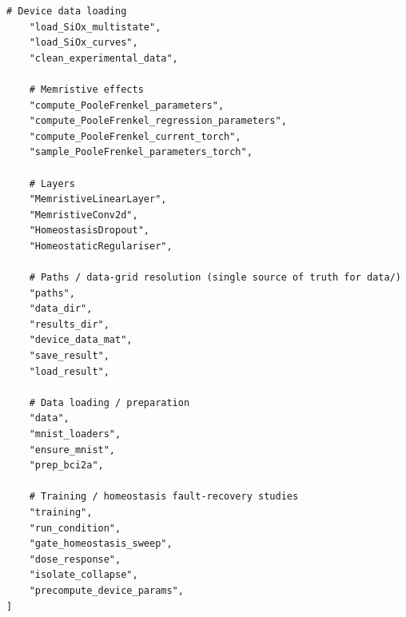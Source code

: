 \begin{lstlisting}[caption={mnn\_torch/\_\_init\_\_.py},label={lst:mnn-src-__init__}]
    # Device data loading
    "load_SiOx_multistate",
    "load_SiOx_curves", 
    "clean_experimental_data",
    
    # Memristive effects
    "compute_PooleFrenkel_parameters",
    "compute_PooleFrenkel_regression_parameters",
    "compute_PooleFrenkel_current_torch",
    "sample_PooleFrenkel_parameters_torch",

    # Layers
    "MemristiveLinearLayer",
    "MemristiveConv2d",
    "HomeostasisDropout",
    "HomeostaticRegulariser",

    # Paths / data-grid resolution (single source of truth for data/)
    "paths",
    "data_dir",
    "results_dir",
    "device_data_mat",
    "save_result",
    "load_result",

    # Data loading / preparation
    "data",
    "mnist_loaders",
    "ensure_mnist",
    "prep_bci2a",

    # Training / homeostasis fault-recovery studies
    "training",
    "run_condition",
    "gate_homeostasis_sweep",
    "dose_response",
    "isolate_collapse",
    "precompute_device_params",
]
\end{lstlisting}


